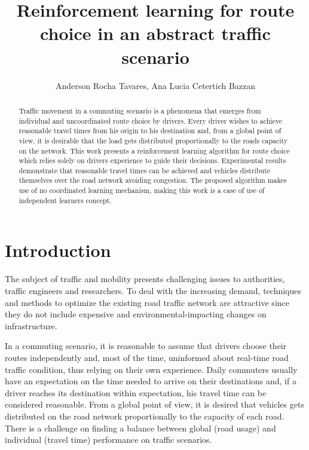 \documentclass[12pt]{article}
\title{Reinforcement learning for route choice in an abstract traffic scenario}
\author{
  Anderson Rocha Tavares\inst{1}, Ana Lucia Cetertich Bazzan\inst{1}
}
\begin{document}
\maketitle

\begin{abstract}
Traffic movement in a commuting scenario is a phenomena that emerges from individual and uncoordinated route choice by drivers. Every driver wishes to achieve reasonable travel times from his origin to his destination and, from a global point of view, it is desirable that the load gets distributed proportionally to the roads capacity on the network. This work presents a reinforcement learning algorithm for route choice which relies solely on drivers experience to guide their decisions. Experimental results demonstrate that reasonable travel times can be achieved and vehicles distribute themselves over the road network avoiding congestion. The proposed algorithm makes use of no coordinated learning mechanism, making this work is a case of use of independent learners concept.
\end{abstract}





\section{Introduction}
The subject of traffic and mobility presents challenging issues to authorities, traffic engineers and researchers. To deal with the increasing demand, techniques and methods to optimize the existing road traffic network are attractive since they do not include expensive and environmental-impacting changes on infrastructure.

In a commuting scenario, it is reasonable to assume that drivers choose their routes independently and, most of the time, uninformed about real-time road traffic condition, thus relying on their own experience. Daily commuters usually have an expectation on the time needed to arrive on their destinations and, if a driver reaches its destination within expectation, his travel time can be considered  reasonable. From a global point of view, it is desired that vehicles gets distributed on the road network proportionally to the capacity of each road. There is a challenge on finding a balance between global (road usage) and individual (travel time) performance on traffic scenarios.
\end{document}

